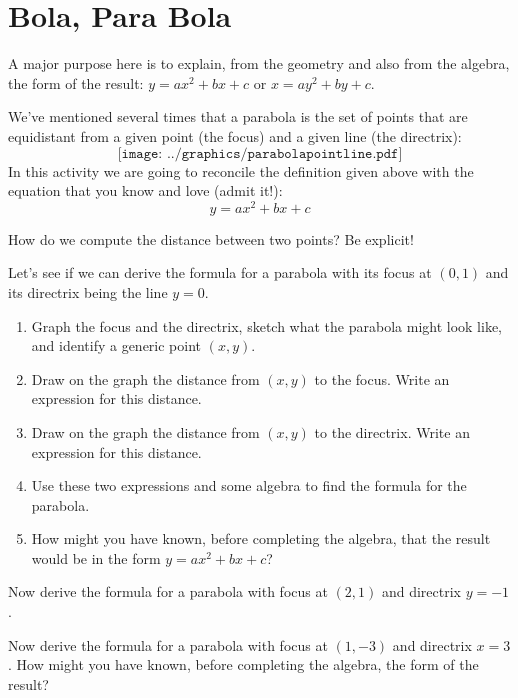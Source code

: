 \newpage
\section{Bola, Para Bola}           
\begin{teachingnote}
A major purpose here is to explain, from the geometry and also from the algebra, the form of the result:
$y = ax^2 + bx + c$ or $x = ay^2 + by + c$.  
\end{teachingnote}
We've mentioned several times that a parabola is the set of points
that are equidistant from a given point (the focus) and a given line
(the directrix):
\[
\texttt{[image: ../graphics/parabolapointline.pdf]}
\]
In this activity we are going to reconcile the definition given
above with the equation that you know and love (admit it!):
\[
y = ax^2 + bx + c
\]

\begin{prob}
How do we compute the distance between two points? Be explicit!
\end{prob}

\begin{prob}
Let's see if we can derive the formula for a parabola with its focus at $(0,1)$ and its directrix being the line $y=0$.
\begin{enumerate}
\item Graph the focus and the directrix, sketch what the parabola might look like, and identify a generic point $(x, y)$.  
\item Draw on the graph the distance from $(x,y)$ to the focus.  Write an expression for this distance.  
\item Draw on the graph the distance from $(x,y)$ to the directrix.  Write an expression for this distance.  
\item Use these two expressions and some algebra to find the formula for the parabola. 
\vspace{.5in}
\item How might you have known, before completing the algebra, that the result would be in the form 
$y = ax^2 + bx + c$? 
\end{enumerate}
\end{prob}
\vspace{.5in}

\begin{prob}
Now derive the formula for a parabola with focus at $(2,1)$ and directrix $y=-1$.
\end{prob}
\vspace{1in}

\begin{prob}
Now derive the formula for a parabola with focus at $(1,-3)$ and directrix $x=3$.  How might you have known, before completing the algebra, the form of the result?   
\end{prob}





